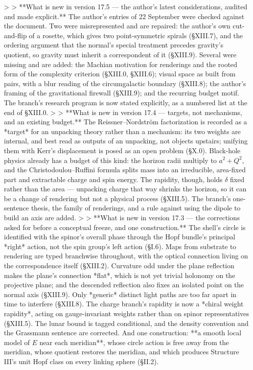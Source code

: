 >
> **What is new in version 17.5 — the author's latest considerations, audited and made explicit.** The author's entries of 22 September were checked against the document. Two were misrepresented and are repaired: the author's own cut-and-flip of a rosette, which gives two point-symmetric spirals (§XIII.7), and the ordering argument that the normal's special treatment precedes gravity's quotient, so gravity must inherit a correspondent of it (§XIII.9). Several were missing and are added: the Machian motivation for renderings and the rooted form of the complexity criterion (§XIII.0, §XIII.6); visual space as built from pairs, with a blur reading of the circumgalactic boundary (§XIII.8); the author's framing of the gravitational firewall (§XIII.9); and the recurring budget motif. The branch's research program is now stated explicitly, as a numbered list at the end of §XIII.0.
>
> **What is new in version 17.4 — targets, not mechanisms, and an existing budget.** The Reissner–Nordström factorization is recorded as a *target* for an unpacking theory rather than a mechanism: its two weights are internal, and best read as outputs of an unpacking, not objects upstairs; unifying them with Kerr's displacement is posed as an open problem (§X.0). Black-hole physics already has a budget of this kind: the horizon radii multiply to $a^2+Q^2$, and the Christodoulou–Ruffini formula splits mass into an irreducible, area-fixed part and extractable charge and spin energy. The rapidity, though, holds $\delta$ fixed rather than the area — unpacking charge that way shrinks the horizon, so it can be a change of rendering but not a physical process (§XIII.5). The branch's one-sentence thesis, the family of renderings, and a rule against using the dipole to build an axis are added.
>
> **What is new in version 17.3 — the corrections asked for before a conceptual freeze, and one construction.** The shell's circle is identified with the spinor's overall phase through the Hopf bundle's principal *right* action, not the spin group's left action (§I.6). Maps from substrate to rendering are typed branchwise throughout, with the optical connection living on the correspondence itself (§XIII.2). Curvature odd under the plane reflection makes the plane's connection *flat*, which is not yet trivial holonomy on the projective plane; and the descended reflection also fixes an isolated point on the normal axis (§XIII.9). Only *generic* distinct light paths are too far apart in time to interfere (§XIII.8). The charge branch's rapidity is now a *chiral weight rapidity*, acting on gauge-invariant weights rather than on spinor representatives (§XIII.5). The lunar bound is tagged conditional, and the density convention and the Grassmann sentence are corrected. And one construction: **a smooth local model of $E$ near each meridian**, whose circle action is free away from the meridian, whose quotient restores the meridian, and which produces Structure III's unit Hopf class on every linking sphere (§II.2).
